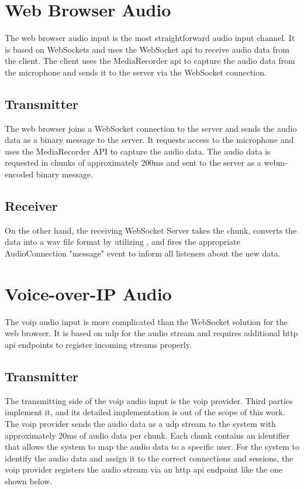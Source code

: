 \section{Web Browser Audio}

The web browser audio input is the most straightforward audio input channel. It is based on WebSockets and
uses the WebSocket \ac{api} to receive audio data from the client. The client uses the MediaRecorder \ac{api} to 
capture the audio data from the microphone and sends it to the server via the WebSocket connection.

\subsection{Transmitter}

The web browser joins a WebSocket connection to the server and sends the audio data as a binary message to the server. 
It requests access to the microphone and uses the MediaRecorder API to capture the audio data. 
The audio data is requested in chunks of approximately 200ms and sent to the server as a \ac{webm}-encoded binary 
message.

\subsection{Receiver}

On the other hand, the receiving WebSocket Server takes the chunk, converts the data into a \ac{wav} file format by 
utilizing \cite{ffmpeg2023}, and fires the appropriate AudioConnection "message" event to inform all listeners about 
the new data.


\section{Voice-over-IP Audio}

The \ac{voip} audio input is more complicated than the WebSocket solution for the web browser. It is based on \ac{udp} 
for the audio stream and requires additional \ac{http} \ac{api} endpoints to register incoming streams properly.

\subsection{Transmitter}

The transmitting side of the \ac{voip} audio input is the \ac{voip} provider. Third parties implement it, and its 
detailed implementation is out of the scope of this work. The \ac{voip} provider sends the audio data as a \ac{udp} 
stream to the system with approximately 20ms of audio data per chunk. Each chunk contains an identifier that allows the 
system to map the audio data to a specific user. For the system to identify the audio data and assign it to the correct 
connections and sessions, the \ac{voip} provider registers the audio stream via an \ac{http} \ac{api} endpoint like the 
one shown below.

